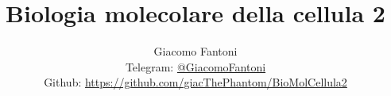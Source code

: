 

\title{\Huge \textbf{Biologia molecolare della cellula 2}}

\author{
  Giacomo Fantoni \\
  \small Telegram: \href{https://t.me/GiacomoFantoni}{@GiacomoFantoni} \\[3pt]
  \small Github: \href{https://github.com/giacThePhantom/BioMolCellula2}{https://github.com/giacThePhantom/BioMolCellula2}}

\maketitle
\tableofcontents


